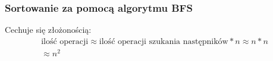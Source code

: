 \documentclass[]{article}
\begin{document}
		\subsubsection{Sortowanie za pomocą algorytmu BFS}
			Cechuje się złożonością:
			\begin{multline}
				\text{ilość operacji} \approx \text{ilość operacji szukania następników} * n \approx n * n \\ \approx n^2
			\end{multline}
		
\clearpage
\glsaddall
\printglossary[title=Zastosowane oznaczenia, toctitle=Oznaczenia]
\end{document}
